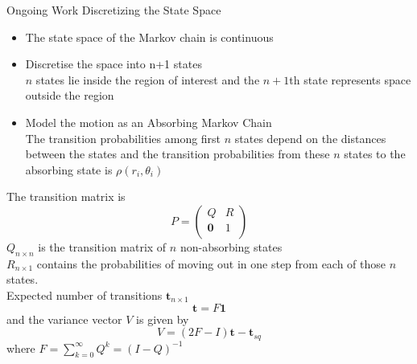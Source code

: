 \documentclass{beamer}
\begin{document}
\begin{frame}{Ongoing Work} {Discretizing the State Space}

\begin{itemize}

\item The state space of the Markov chain is continuous
\item Discretise the space into n+1 states \\
$n$ states lie inside the region of interest and the $n+1$th state represents space outside the region 
\pause 
\item Model the motion as an Absorbing Markov Chain \\ 
The transition probabilities among first $n$ states depend on the distances between the states and the transition probabilities from these $n$ states to the absorbing state is $\rho(r_i,\theta_i)$  
\end{itemize}
\end{frame}

\begin{frame}
The transition matrix is  
\begin{equation*}
	P  = \left(
	\begin{array}{cc}
	Q & R \\
		\mathbf{0} & 1 \\
	\end{array} \right)
\end{equation*}
	$Q_{n \times n}$ is the transition matrix of $n$ non-absorbing states\\
	$R_{n\times1}$ contains the probabilities of moving out in one step from 
	each of those $n$ states. \\
	 Expected number of transitions $\mathbf{t}_{n \times 1}$ 
\begin{equation*}
	\mathbf{t} = F\mathbf{1}
\end{equation*}
and the variance vector $V$ is given by
\begin{equation*}
	 V = (2F-I)\mathbf{t} - \mathbf{t}_{sq}
\end{equation*}
where $F = \sum_{k=0}^{\infty} Q^k = (I-Q)^{-1}$ 
\end{frame}
\end{document}
